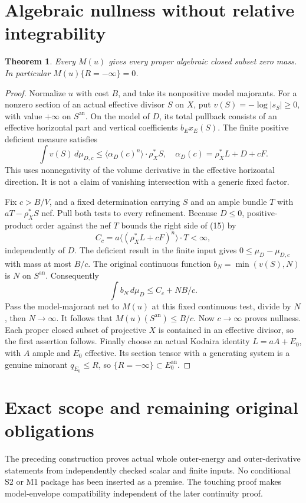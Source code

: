 \documentclass[11pt]{article}
\newtheorem{theorem}{Theorem}
\begin{document}
\section{Algebraic nullness without relative integrability}
\begin{theorem}\label{null}
Every $M(u)$ gives every proper algebraic closed subset zero mass.
In particular $M(u)\{R=-\infty\}=0$.
\end{theorem}
\begin{proof}
Normalize $u$ with cost $B$, and take its nonpositive model
majorants. For a nonzero section of an actual effective divisor $S$
on $X$, put $v(S)=-\log|s_S|\geq0$, with value $+\infty$ on
$S^{\mathrm{an}}$. On the model of $D$, its total pullback consists
of an effective horizontal part and vertical coefficients
$b_E x_E(S)$. The finite positive deficient measure satisfies
\[
 \int v(S)\,d\mu_{D,c}
 \leq\langle\alpha_D(c)^n\rangle\cdot\rho_X^*S,
 \quad \alpha_D(c)=\rho_X^*L+D+cF.                      \tag{15}
\]
This uses nonnegativity of the volume derivative in the effective
horizontal direction. It is not a claim of vanishing intersection
with a generic fixed factor.

Fix $c>B/V$, and a fixed determination carrying $S$ and an ample
bundle $T$ with $aT-\rho_X^*S$ nef. Pull both tests to every
refinement. Because $D\leq0$, positive-product order against the
nef $T$ bounds the right side of (15) by
\[
 C_c=a\langle(\rho_X^*L+cF)^n\rangle\cdot T<\infty,
                                                        \tag{16}
\]
independently of $D$. The deficient result in the finite input gives
$0\leq\mu_D-\mu_{D,c}$ with mass at most $B/c$.
The original continuous function $b_N=\min(v(S),N)$ is
$N$ on $S^{\mathrm{an}}$. Consequently
\[
 \int b_N\,d\mu_D\leq C_c+NB/c.
\]
Pass the model-majorant net to $M(u)$ at this fixed continuous
test, divide by $N$, then $N\to\infty$. It follows that
$M(u)(S^{\mathrm{an}})\leq B/c$.
Now $c\to\infty$ proves nullness. Each proper closed subset of
projective $X$ is contained in an effective divisor, so the first
assertion follows. Finally choose an actual Kodaira identity
$L=aA+E_0$, with $A$ ample and $E_0$ effective.
Its section tensor with a generating system is a genuine minorant
$q_{E_0}\leq R$, so $\{R=-\infty\}\subset E_0^{\mathrm{an}}$.
\end{proof}

\section{Exact scope and remaining original obligations}
The preceding construction proves actual whole outer-energy and
outer-derivative statements from independently checked scalar and
finite inputs. No conditional S2 or M1 package has been inserted
as a premise. The touching proof makes model-envelope compatibility
independent of the later continuity proof.
\end{document}
